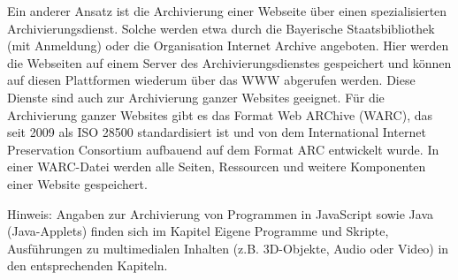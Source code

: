 Ein anderer Ansatz ist die Archivierung einer Webseite über einen spezialisierten Archivierungsdienst. Solche werden etwa durch die Bayerische Staatsbibliothek (mit Anmeldung) oder die Organisation Internet Archive angeboten. Hier werden die Webseiten auf einem Server des Archivierungsdienstes gespeichert und können auf diesen Plattformen wiederum über das WWW abgerufen werden. Diese Dienste sind auch zur Archivierung ganzer Websites geeignet. Für die Archivierung ganzer Websites gibt es das Format Web ARChive (WARC), das seit 2009 als ISO 28500 standardisiert ist und von dem International Internet Preservation Consortium aufbauend auf dem Format ARC entwickelt wurde. In einer WARC-Datei werden alle Seiten, Ressourcen und weitere Komponenten einer Website gespeichert.

Hinweis: Angaben zur Archivierung von Programmen in JavaScript sowie Java (Java-Applets) finden sich im Kapitel Eigene Programme und Skripte, Ausführungen zu multimedialen Inhalten (z.B. 3D-Objekte, Audio oder Video) in den entsprechenden Kapiteln. 

